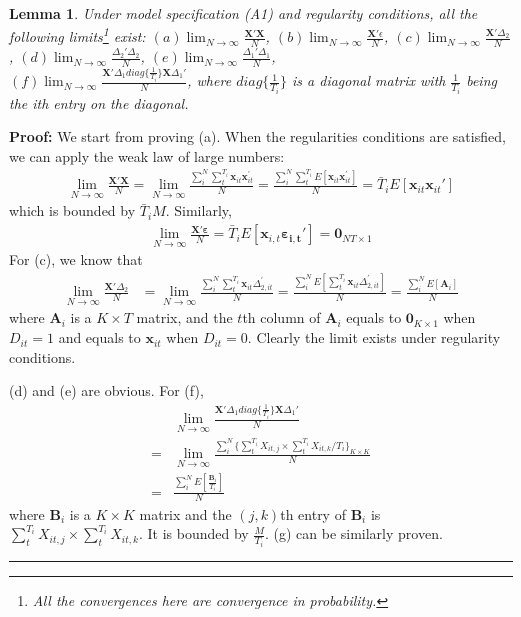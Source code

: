 \documentclass[12pt]{article}
\newtheorem{lemma}{Lemma}
\newenvironment{proof}[1][Proof]{\noindent\textbf{#1:} }{\  \rule{0.5em}{0.5em}}
\begin{document}
\begin{lemma}
Under model specification (A1) and regularity conditions, all the following limits\footnote{All the convergences here are convergence in probability.} exist: 
$(a) \lim_{N \rightarrow \infty} \frac{\mathbf{X}'\mathbf{X}}{N}$, 
$(b) \lim_{N \rightarrow \infty} \frac{\mathbf{X}'\epsilon}{N}$, 
$(c) \lim_{N \rightarrow \infty} \frac{\mathbf{X}'\Delta_2}{N}$, 
$(d) \lim_{N \rightarrow \infty} \frac{\Delta_2'\Delta_2}{N}$, 
$(e) \lim_{N \rightarrow \infty} \frac{\Delta_1'\Delta_1}{N}$,\\ 
$(f) \lim_{N \rightarrow \infty} \frac{\mathbf{X}'\Delta_1 diag\{\frac{1}{T_i}\}\mathbf{X}\Delta_1'}{N}$, where $diag\{\frac{1}{T_i}\}$ is a diagonal matrix with $\frac{1}{T_i}$ being the ith entry on the diagonal. 
\end{lemma}
\begin{proof} We start from proving (a). When the regularities conditions are satisfied, we can apply the weak law of large numbers:
\begin{align*}
\lim_{N \rightarrow \infty} \frac{\mathbf{X}'\mathbf{X}}{N} = \lim_{N \rightarrow \infty} \frac{\sum_{i}^{N} \sum_{t}^{T_i} \mathbf{x}_{it}\mathbf{x}_{it}^{'}}{N} =  \frac{\sum_{i}^{N} \sum_{t}^{T_i}
E\left[\mathbf{x}_{it}\mathbf{x}_{it}^{'}\right]}{N} = \bar{T}_i  E\left[\mathbf{x}_{it}\mathbf{x}_{it}' \right]
\end{align*}
which is bounded by $\bar{T}_i M$.
Similarly,
\begin{align*}
\lim_{N \rightarrow \infty} \frac{\mathbf{X}'\mathbf{\varepsilon}}{N} = \bar{T}_i  E\left[\mathbf{x}_{i,t}\mathbf{\varepsilon_{i,t}}' \right] = \mathbf{0}_{NT \times 1}
\end{align*}
For (c), we know that
\begin{align*}
\lim_{N \rightarrow \infty} \frac{\mathbf{X}'\Delta_2}{N} & = \lim_{N \rightarrow \infty} \frac{\sum_{i}^{N} \sum_{t}^{T_i} \mathbf{x}_{it}\Delta_{2, it}^{'}}{N}   =  \frac{\sum_{i}^{N} E\left[\sum_{t}^{T_i} \mathbf{x}_{it}\Delta_{2, it}^{'}\right]}{N} = \frac{\sum_{i}^{N} E\left[\mathbf{A}_i \right]}{N}
\end{align*}
where $\mathbf{A}_i$ is a $K \times T$ matrix, and the $t$th column of $\mathbf{A}_i$ equals to $\mathbf{0}_{K \times 1}$ when $D_{it} = 1$ and equals to $\mathbf{x}_{it}$ when $D_{it} = 0$. Clearly the limit exists under regularity conditions.

(d) and (e) are obvious.
For (f), 
\begin{align*}
& \lim_{N \rightarrow \infty} \frac{\mathbf{X}'\Delta_1 diag\{\frac{1}{T_i}\}  \mathbf{X}\Delta_1'}{N} \\
= & \lim_{N \rightarrow \infty} \frac{\sum_i^N \{\sum_{t}^{T_i}X_{it, j} \times \sum_{t}^{T_i}X_{it, k} / T_i\}_{K\times K}}{N} \\
= & \frac{\sum_i^N E\left[\frac{\mathbf{B}_i  }{T_i}\right]}{N}
\end{align*}
where $\mathbf{B}_i$ is a $K \times K$ matrix and the $(j, k)$th entry of $\mathbf{B}_i$ is $\sum_{t}^{T_i}X_{it, j} \times \sum_{t}^{T_i}X_{it, k}$. It is bounded by $\frac{M}{T_i}$.
(g) can be similarly proven.
\end{proof}
\end{document}
